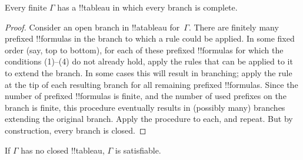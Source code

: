 \documentclass[../../../include/open-logic-section]{subfiles}
\begin{document}
\begin{prop}
  Every finite $\Gamma$ has a !!{tableau} in which every branch is complete.
\end{prop}

\begin{proof}
  Consider an open branch in !!a{tableau} for~$\Gamma$. There are
  finitely many prefixed !!{formula}s in the branch to which a rule
  could be applied. In some fixed order (say, top to bottom), for each
  of these prefixed !!{formula}s for which the conditions (1)--(4) do
  not already hold, apply the rules that can be applied to it to
  extend the branch. In some cases this will result in branching;
  apply the rule at the tip of each resulting branch for all remaining
  prefixed !!{formula}s. Since the number of prefixed !!{formula}s is
  finite, and the number of used prefixes on the branch is finite,
  this procedure eventually results in (possibly many) branches
  extending the original branch. Apply the procedure to each, and
  repeat. But by construction, every branch is closed.
\end{proof}

\begin{thm}[Completeness]
  If $\Gamma$ has no closed !!{tableau}, $\Gamma$ is satisfiable.
\end{thm}
\end{document}
